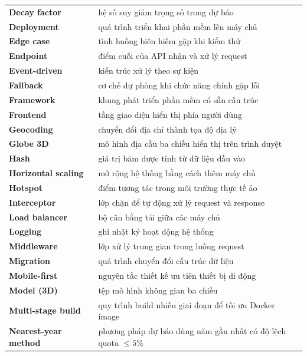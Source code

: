 \documentclass[../DoAn.tex]{subfiles}
\begin{document}
\begin{longtable}{p{4.2cm} p{10.3cm}}
    \textbf{Decay factor}         & hệ số suy giảm trọng số trong dự báo \\
    \textbf{Deployment}           & quá trình triển khai phần mềm lên máy chủ \\
    \textbf{Edge case}            & tình huống biên hiếm gặp khi kiểm thử \\
    \textbf{Endpoint}             & điểm cuối của API nhận và xử lý request \\
    \textbf{Event-driven}         & kiến trúc xử lý theo sự kiện \\
    \textbf{Fallback}             & cơ chế dự phòng khi chức năng chính gặp lỗi \\
    \textbf{Framework}            & khung phát triển phần mềm có sẵn cấu trúc \\
    \textbf{Frontend}             & tầng giao diện hiển thị phía người dùng \\
    \textbf{Geocoding}            & chuyển đổi địa chỉ thành tọa độ địa lý \\
    \textbf{Globe 3D}             & mô hình địa cầu ba chiều hiển thị trên trình duyệt \\
    \textbf{Hash}                 & giá trị băm được tính từ dữ liệu đầu vào \\
    \textbf{Horizontal scaling}   & mở rộng hệ thống bằng cách thêm máy chủ \\
    \textbf{Hotspot}              & điểm tương tác trong môi trường thực tế ảo \\
    \textbf{Interceptor}          & lớp chặn để tự động xử lý request và response \\
    \textbf{Load balancer}        & bộ cân bằng tải giữa các máy chủ \\
    \textbf{Logging}              & ghi nhật ký hoạt động hệ thống \\
    \textbf{Middleware}           & lớp xử lý trung gian trong luồng request \\
    \textbf{Migration}            & quá trình chuyển đổi cấu trúc dữ liệu \\
    \textbf{Mobile-first}         & nguyên tắc thiết kế ưu tiên thiết bị di động \\
    \textbf{Model (3D)}           & tệp mô hình không gian ba chiều \\
    \textbf{Multi-stage build}    & quy trình build nhiều giai đoạn để tối ưu Docker image \\
    \textbf{Nearest-year method}  & phương pháp dự báo dùng năm gần nhất có độ lệch quota $\leq 5\%$ \\

\end{longtable}
\end{document}
